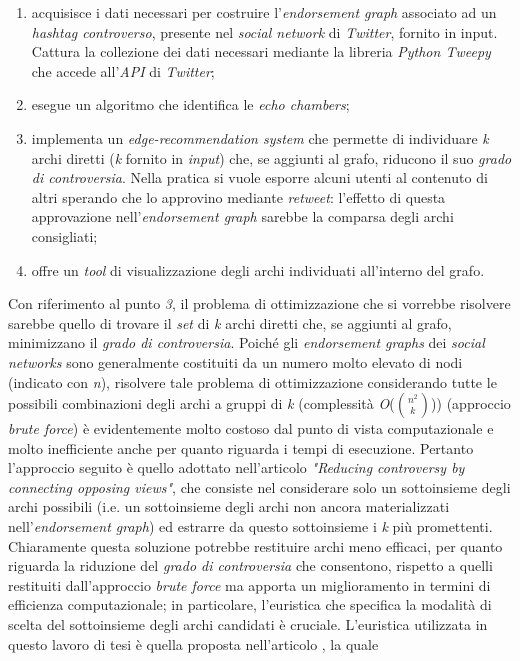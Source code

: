 \documentclass[trieste,12pt]{toptesi}
\begin{document}
\begin{enumerate}
\item acquisisce i dati necessari per costruire l'\textit{endorsement graph} associato ad un \textit{hashtag controverso}, presente nel \textit{social network} di \textit{Twitter}, fornito in input. Cattura la collezione dei dati necessari mediante la libreria \textit{Python Tweepy} che accede all'\textit{API} di \textit{Twitter};
\item esegue un algoritmo che identifica le \textit{echo chambers};
\item implementa un \textit{edge-recommendation system} che permette di individuare \textit{k} archi diretti (\textit{k} fornito in \textit{input}) che, se aggiunti al grafo, riducono il suo \textit{grado di controversia}. Nella pratica si vuole esporre alcuni utenti al contenuto di altri sperando che lo approvino mediante \textit{retweet}: l'effetto di questa approvazione nell'\textit{endorsement graph} sarebbe la comparsa degli archi consigliati;
\item offre un \textit{tool} di visualizzazione degli archi individuati all'interno del grafo.
\end{enumerate}
Con riferimento al punto \textit{3}, il problema di ottimizzazione che si vorrebbe risolvere sarebbe quello di trovare il \textit{set} di \textit{k} archi diretti che, se aggiunti al grafo, minimizzano il \textit{grado di controversia}.
Poiché gli \textit{endorsement graphs} dei \textit{social networks} sono generalmente costituiti da un numero molto elevato di nodi (indicato con \textit{n}), risolvere tale problema di ottimizzazione considerando tutte le possibili combinazioni degli archi a gruppi di \textit{k} (complessità \textit{O}(${n^2\choose k}$)) (approccio \textit{brute force}) è evidentemente molto costoso dal punto di vista computazionale e molto inefficiente anche per quanto riguarda i tempi di esecuzione. Pertanto l'approccio seguito è quello adottato nell'articolo \textit{"Reducing controversy by connecting opposing views"}\cite{garimella:paper}, che consiste nel considerare solo un sottoinsieme degli archi possibili (i.e. un sottoinsieme degli archi non ancora materializzati nell'\textit{endorsement graph}) ed estrarre da questo sottoinsieme i \textit{k} più promettenti. Chiaramente questa soluzione potrebbe restituire archi meno efficaci, per quanto riguarda la riduzione del \textit{grado di controversia} che consentono, rispetto a quelli restituiti dall'approccio \textit{brute force} ma apporta un miglioramento in termini di efficienza computazionale; in particolare, l'euristica che specifica la modalità di scelta del sottoinsieme degli archi candidati è cruciale. L'euristica utilizzata in questo lavoro di tesi è quella proposta nell'articolo \cite{garimella:paper}, la quale
\end{document}
